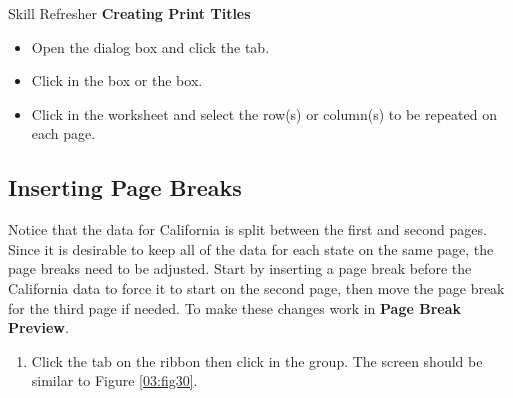 \begin{center}
	\begin{sklbox}{Skill Refresher}
		\textbf{Creating Print Titles}
		\\
		\begin{itemize}
			\setlength{\itemsep}{0pt}
			\setlength{\parskip}{0pt}
			\setlength{\parsep}{0pt}

			\item Open the  dialog box and click the  tab.
			\item Click in the  box or the  box.
			\item Click in the worksheet and select the row(s) or column(s) to be repeated on each page.
						
		\end{itemize}
	\end{sklbox}
\end{center}

\subsection{Inserting Page Breaks}

Notice that the data for California is split between the first and second pages. Since it is desirable to keep all of the data for each state on the same page, the page breaks need to be adjusted. Start by inserting a page break before the California data to force it to start on the second page, then move the page break for the third page if needed. To make these changes work in \textbf{Page Break Preview}.

\begin{enumerate}
	\item Click the  tab on the ribbon then click  in the  group. The screen should be similar to Figure \ref{03:fig30}.
\end{enumerate}

